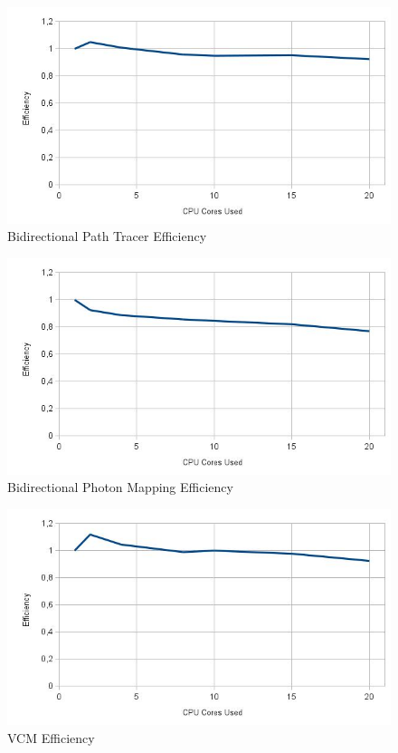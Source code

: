 \begin{figure}[H]
\centering
\includegraphics[width=0.8\linewidth]{img/bptEff.jpg}
\caption{\label{img:bptEff} Bidirectional Path Tracer Efficiency}
\end{figure}

\begin{figure}[H]
\centering
\includegraphics[width=0.8\linewidth]{img/bpmEff.jpg}
\caption{\label{img:bpmEff} Bidirectional Photon Mapping Efficiency}
\end{figure}

\begin{figure}[H]
\centering
\includegraphics[width=0.8\linewidth]{img/vcmEff.jpg}
\caption{\label{img:vcmEff} VCM Efficiency}
\end{figure}

